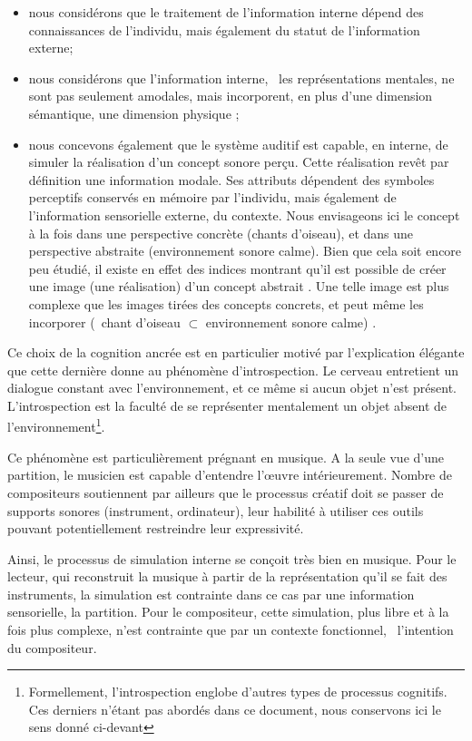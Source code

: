 \begin{itemize}
\item nous considérons que le traitement de l'information interne dépend des connaissances de l'individu, mais également du statut de l'information externe;
\item nous considérons que l'information interne, \ie~les représentations mentales, ne sont pas seulement amodales, mais incorporent, en plus d'une dimension sémantique, une dimension physique \citep{barsalou2008grounded};
\item nous concevons également que le système auditif est capable, en interne, de simuler la réalisation d'un concept sonore perçu. Cette réalisation revêt par définition une information modale. Ses attributs dépendent des symboles perceptifs conservés en mémoire par l'individu, mais également de l'information sensorielle externe, du contexte. Nous envisageons ici le concept à la fois dans une perspective concrète (chants d'oiseau), et dans une perspective abstraite (environnement sonore calme). Bien que cela soit encore peu étudié, il existe en effet des indices montrant qu'il est possible de créer une image (une réalisation) d'un concept abstrait \citep{barsalou2003abstraction,barsalou2005situating}. Une telle image est plus complexe que les images tirées des concepts concrets, et peut même les incorporer (\eg~chant d'oiseau $\subset$ environnement sonore calme) \citep{barsalou2005situating}.
\end{itemize}
 
Ce choix de la cognition ancrée est en particulier motivé par l'explication élégante que cette dernière donne au phénomène d'introspection. Le cerveau entretient un dialogue constant avec l'environnement, et ce même si aucun objet n'est présent. L'introspection est la faculté de se représenter mentalement un objet absent de l'environnement\footnote{Formellement, l'introspection englobe d'autres types de processus cognitifs. Ces derniers n'étant pas abordés dans ce document, nous conservons ici le sens donné ci-devant}.

Ce phénomène est particulièrement prégnant en musique. A la seule vue d'une partition, le musicien est capable d'entendre l'œuvre intérieurement. Nombre de compositeurs soutiennent par ailleurs que le processus créatif doit se passer de supports sonores (instrument, ordinateur), leur habilité à utiliser ces outils pouvant potentiellement restreindre leur expressivité.

Ainsi, le processus de simulation interne se conçoit très bien en musique. Pour le lecteur, qui reconstruit la musique à partir de la représentation qu'il se fait des instruments, la simulation est contrainte dans ce cas par une information sensorielle, la partition. Pour le compositeur, cette simulation, plus libre et à la fois plus complexe, n'est contrainte que par un contexte fonctionnel, \ie~l'intention du compositeur.

